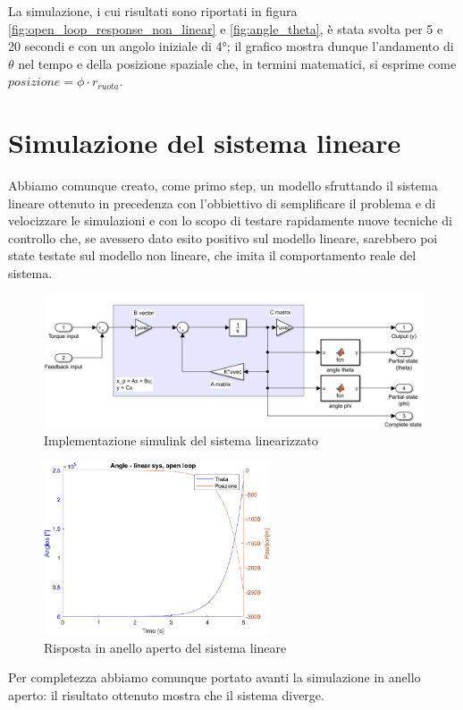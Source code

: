 La simulazione, i cui risultati sono riportati in figura \ref{fig:open_loop_response_non_linear} e \ref{fig:angle_theta}, è stata svolta per 5 e 20 secondi e con un angolo iniziale di 4°; il grafico mostra dunque l'andamento di $\theta$ nel tempo e della posizione  spaziale che, in termini matematici, si esprime come $posizione = \phi \cdot{r_{ruota}}$.

\section{Simulazione del sistema lineare}
\label{sec:simulazione_reale}
Abbiamo comunque creato, come primo step, un modello sfruttando il sistema lineare ottenuto in precedenza  con l'obbiettivo di semplificare il problema e di velocizzare le simulazioni e con lo scopo di testare rapidamente nuove tecniche di controllo che, se avessero dato esito positivo sul modello lineare, sarebbero poi state testate sul modello non lineare, che imita il comportamento reale del sistema.
\begin{figure}[H]
	\centering   	
	\includegraphics[width=1\textwidth]{Immagini/linear_system.png}
	\caption{Implementazione simulink del sistema linearizzato}
	\label{fig:linear_system}
\end{figure}

\begin{figure}[H]
	\centering   	
	\includegraphics[width=0.6\textwidth]{Immagini/linear_open_loop.png}
	\caption{Risposta in anello aperto del sistema lineare}
	\label{fig:open_loop_response}
\end{figure}
Per completezza abbiamo comunque portato avanti la simulazione in anello aperto: il risultato ottenuto mostra che il sistema diverge.

